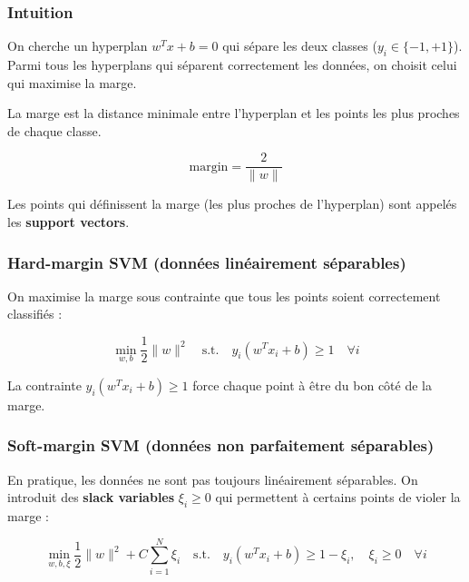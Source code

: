 \documentclass[11pt,a4paper,openany]{book}
\begin{document}
\vspace{0.5cm}

\subsubsection{Intuition}

On cherche un hyperplan $w^T x + b = 0$ qui sépare les deux classes ($y_i \in \{-1, +1\}$).
Parmi tous les hyperplans qui séparent correctement les données, on choisit celui qui maximise la marge.

\vspace{0.5cm}

\begin{defnbox}[title=Margin]
La marge est la distance minimale entre l'hyperplan et les points les plus proches de chaque classe.

\[
\text{margin} = \frac{2}{\|w\|}
\]

Les points qui définissent la marge (les plus proches de l'hyperplan) sont appelés les \textbf{support vectors}.
\end{defnbox}

\vspace{0.6cm}

\subsubsection{Hard-margin SVM (données linéairement séparables)}

On maximise la marge sous contrainte que tous les points soient correctement classifiés :

\[
\min_{w, b} \frac{1}{2} \|w\|^2
\quad \text{s.t.} \quad
y_i (w^T x_i + b) \geq 1 \quad \forall i
\]

La contrainte $y_i (w^T x_i + b) \geq 1$ force chaque point à être du bon côté de la marge.

\vspace{0.6cm}

\subsubsection{Soft-margin SVM (données non parfaitement séparables)}

En pratique, les données ne sont pas toujours linéairement séparables.
On introduit des \textbf{slack variables} $\xi_i \geq 0$ qui permettent à certains points de violer la marge :

\[
\min_{w, b, \xi} \frac{1}{2} \|w\|^2 + C \sum_{i=1}^{N} \xi_i
\quad \text{s.t.} \quad
y_i (w^T x_i + b) \geq 1 - \xi_i, \quad \xi_i \geq 0 \quad \forall i
\]
\end{document}
